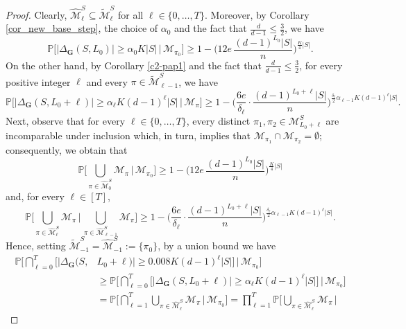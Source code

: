 \documentclass[10pt,a4paper]{amsart}
\begin{document}
\begin{proof}
Clearly, $\widehat{\mathcal{M}}^S_\ell\subseteq\widetilde{\mathcal{M}}^S_\ell$
for all $\ell\in \{0,\ldots,T\}$. Moreover, by Corollary \ref{cor_new_base_step}, the choice of $\alpha_0$ and the fact that $\frac{d}{d-1}\leqslant \frac{3}{2}$, we have
\[\mathbb{P}\Big[ \big|\Delta_{\mathbf{G}}(S,L_0)\big|\geqslant \alpha_0 K |S| \, \Big| \, \mathcal{M}_{\pi_0} \Big] \geqslant
  1 - \Big(12e\, \frac{(d-1)^{L_0}|S|}{n} \Big)^{\frac{K}{4} |S|}.\]
On the other hand, by Corollary \ref{c2-pap1} and the fact that $\frac{d}{d-1}\leqslant \frac{3}{2}$,
for every positive integer $\ell$ and every $\pi\in \widetilde{\mathcal{M}}^S_{\ell-1}$, we have
\[ \mathbb{P}\Big[ \big|\Delta_{\mathbf{G}}(S,L_0+\ell)\big| \geqslant  \alpha_\ell K (d-1)^\ell |S| \, \Big| \,
\mathcal{M}_{\pi} \Big]
\geqslant 1 - \Big(\frac{6e}{\delta_\ell} \cdot
\frac{(d-1)^{L_0+\ell}|S|}{n}\Big)^{\frac{\delta_\ell}{2} \alpha_{\ell-1}K (d-1)^{\ell} |S|}.\]
Next, observe that for every $\ell\in\{0,\dots,T\}$, every distinct $\pi_1,\pi_2\in \mathcal{M}^S_{L_0+\ell}$ are incomparable
under inclusion which, in turn, implies that $\mathcal{M}_{\pi_1}\cap\mathcal{M}_{\pi_2}=\emptyset$;
consequently, we obtain that
\[\mathbb{P}\bigg[ \bigcup_{\pi\in \widehat{\mathcal{M}}^S_0} \mathcal{M}_{\pi} \, \bigg| \, \mathcal{M}_{\pi_0} \bigg] \geqslant
  1 - \Big(12e\, \frac{(d-1)^{L_0}|S|}{n}
\Big)^{\frac{K}{4} |S|}\]
and, for every $\ell\in[T]$,
\[\mathbb{P}\bigg[ \bigcup_{\pi\in \widehat{\mathcal{M}}^S_\ell} \mathcal{M}_{\pi} \, \bigg| \,
\bigcup_{\pi\in \widehat{\mathcal{M}}^S_{\ell-1}} \mathcal{M}_{\pi} \bigg]
\geqslant 1 - \Big(\frac{6e}{\delta_\ell} \cdot
\frac{(d-1)^{L_0+\ell}|S|}{n}\Big)^{\frac{\delta_\ell}{2} \alpha_{\ell-1}K (d-1)^{\ell} |S|}.\]
Hence, setting $\widetilde{\mathcal{M}}^S_{-1} = \widehat{\mathcal{M}}^S_{-1} := \{\pi_0\}$,
by a union bound  we have
\begin{align}
\mathbb{P}\bigg[  \bigcap_{\ell=0}^T  \Big[ \big|\Delta_{\mathbf{G}}(S, & L_0+\ell)\big| \geqslant
0.008 K (d-1)^\ell |S|  \big]  \, \bigg| \, \mathcal{M}_{\pi_0}  \bigg] \label{e-pap-p4} \\
&\geqslant
\mathbb{P}\bigg[ \bigcap_{\ell=0}^T \Big[ \big|\Delta_{\mathbf{G}}(S,L_0+\ell)\big| \geqslant
\alpha_\ell K(d-1)^\ell |S| \Big]  \, \bigg| \, \mathcal{M}_{\pi_0} \bigg] \nonumber\\
& = \mathbb{P}\bigg[ \bigcap_{\ell=1}^T \bigcup_{\pi\in \widehat{\mathcal{M}}^S_\ell} \mathcal{M}_{\pi} \, \bigg| \, \mathcal{M}_{\pi_0} \bigg] =
\prod_{\ell=1}^{T} \mathbb{P}\bigg[ \bigcup_{\pi\in\widehat{\mathcal{M}}^S_\ell} \mathcal{M}_{\pi} \, \bigg| \,

\end{align}
\end{proof}
\end{document}

